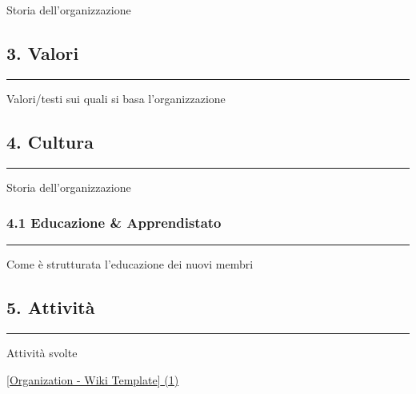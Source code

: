 Storia dell'organizzazione

\subsection{3. Valori}\label{valori}

\begin{center}\rule{0.5\linewidth}{0.5pt}\end{center}

Valori/testi sui quali si basa l'organizzazione

\subsection{4. Cultura}\label{cultura}

\begin{center}\rule{0.5\linewidth}{0.5pt}\end{center}

Storia dell'organizzazione

\subsubsection{4.1 Educazione \&
Apprendistato}\label{educazione-apprendistato}

\begin{center}\rule{0.5\linewidth}{0.5pt}\end{center}

Come è strutturata l'educazione dei nuovi membri

\subsection{5. Attività}\label{attivituxe0}

\begin{center}\rule{0.5\linewidth}{0.5pt}\end{center}

Attività svolte

\href{\%5BOrganization\%20-\%20Wiki\%20Template\%5D\%20(1)\%2051665d93bb0a45b88571315b7bf2274e.md}{{[}Organization
- Wiki Template{]} (1)}
